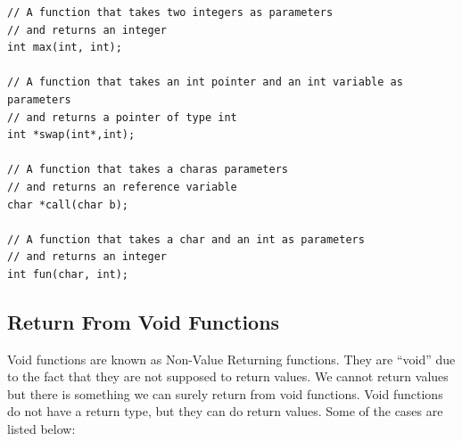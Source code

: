 \documentclass{book}
\begin{document}
\begin{lstlisting}
// A function that takes two integers as parameters
// and returns an integer
int max(int, int);

// A function that takes an int pointer and an int variable as parameters
// and returns a pointer of type int
int *swap(int*,int);

// A function that takes a charas parameters
// and returns an reference variable
char *call(char b);

// A function that takes a char and an int as parameters
// and returns an integer
int fun(char, int);

\end{lstlisting}

\subsection{Return From Void Functions}

Void functions are known as Non-Value Returning functions. They are \enquote{void} due to the fact that they are not supposed to return values. We cannot return values but there is something we can surely return from void functions. Void functions do not have a return type, but they can do return values. Some of the cases are listed below:
\end{document}
